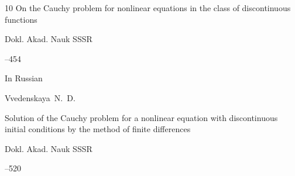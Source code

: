 \begin{thebibliography}{10}
\paper On the Cauchy problem for nonlinear equations in the class of discontinuous functions

\jour Dokl. Akad. Nauk SSSR




--454






\lang In Russian

\by Vvedenskaya~N.~D.

\paper Solution of the Cauchy problem for a nonlinear equation with discontinuous initial conditions by the method of finite differences

\jour Dokl. Akad. Nauk SSSR



--520







\end{thebibliography}











%

